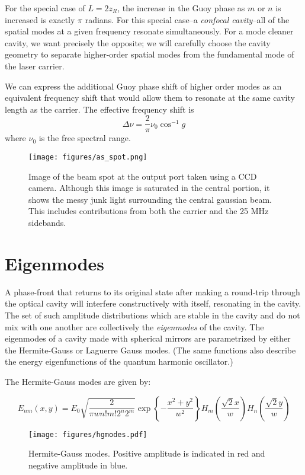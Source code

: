 For the special case of $L = 2 z_R$, the increase in the Guoy phase as
$m$ or $n$ is increased is exactly $\pi$ radians.  For this special
case--a \emph{confocal cavity}--all of the spatial modes at a given
frequency resonate simultaneously.  For a mode cleaner cavity, we want
precisely the opposite; we will carefully choose the cavity geometry
to separate higher-order spatial modes from the fundamental mode of
the laser carrier.

We can express the additional Guoy phase shift of higher order modes
as an equivalent frequency shift that would allow them to resonate at
the same cavity length as the carrier.  The effective frequency shift is
%
\begin{equation}
\Delta\nu = \frac{2}{\pi} \nu_0 \cos^{-1} g
\label{eq:hom-frequency-shift}
\end{equation}
%
where $\nu_0$ is the free spectral range.

\begin{figure}[t]
\centerline{\texttt{[image: figures/as\_spot.png]}}
\caption[Beam spot at anti-symmetric port]{\label{fig:as-spot}Image of
  the beam spot at the output port taken using a CCD camera. Although
  this image is saturated in the central portion, it shows the messy
  junk light surrounding the central gaussian beam.  This includes
  contributions from both the carrier and the 25 MHz sidebands.}
\end{figure}

\section{Eigenmodes}

A phase-front that returns to its original state after making a
round-trip through the optical cavity will interfere constructively
with itself, resonating in the cavity.  The set of such amplitude
distributions which are stable in the cavity and do not mix with one
another are collectively the \emph{eigenmodes} of the cavity.  The
eigenmodes of a cavity made with spherical mirrors are parametrized by
either the Hermite-Gauss or Laguerre Gauss modes.  (The same functions
also describe the energy eigenfunctions of the quantum harmonic
oscillator.)

The Hermite-Gauss modes are given by:

\begin{equation}
E_{nm}(x,y) = E_0 
\sqrt{ 
  \frac{2}{\pi w n! m! 2^n 2^m}
}
\exp \left\{-\frac{x^2+y^2}{w^2}\right\}
H_m\left( \frac{\sqrt{2}x}{w} \right)
H_n\left( \frac{\sqrt{2}y}{w} \right)
\end{equation}

\begin{figure}
\texttt{[image: figures/hgmodes.pdf]}
\caption[Hermite-Gauss TEM modes]{Hermite-Gauss modes. Positive amplitude is indicated in red and negative amplitude in blue.}
\end{figure}
